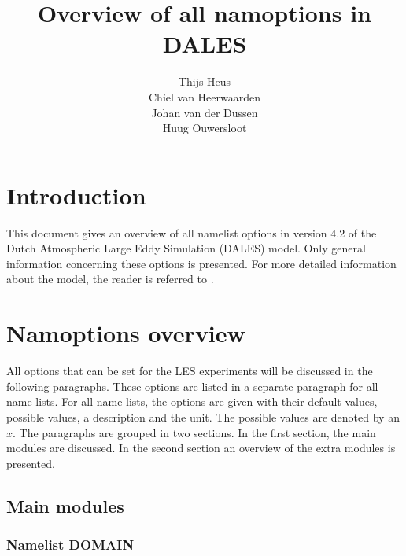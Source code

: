 \documentclass[twoside,11pt,fleqn,a4paper,english,openright]{report}
\begin{document}
 \begin{titlepage}
  \title{\textbf{Overview of all namoptions in DALES}}
  \author{Thijs Heus \\
  Chiel van Heerwaarden \\
  Johan van der Dussen \\
  Huug Ouwersloot}
  \maketitle
 \end{titlepage}
\thispagestyle{empty}

\tableofcontents
{}
\chapter{Introduction}\label{chapter:introduction}

\setcounter{page}{1}
This document gives an overview of all namelist options in version 4.2 of the Dutch Atmospheric Large Eddy Simulation (DALES) model. Only general information concerning these options is presented. For more detailed information about the model, the reader is referred to \citet{Heus2009}. 

\chapter{Namoptions overview}\label{chapter:namoptions}

All options that can be set for the LES experiments will be discussed in the following paragraphs. These options are listed in a separate paragraph for all name lists. For all name lists, the options are given with their default values, possible values, a description and the unit. The possible values are denoted by an $x$. The paragraphs are grouped in two sections. In the first section, the main modules are discussed. In the second section an overview of the extra modules is presented.

\section{Main modules}\label{par:mainmod}

\subsection{Namelist DOMAIN}\label{par:domain}
\end{document}
